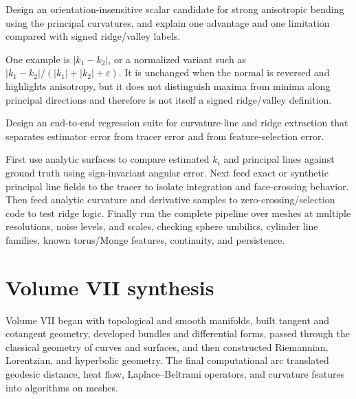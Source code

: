 \begin{problem}\label{prob:vii42-ch04}
Design an orientation-insensitive scalar candidate for strong anisotropic bending using the principal curvatures, and explain one advantage and one limitation compared with signed ridge/valley labels.
\end{problem}

\begin{solution}
One example is \(|k_1-k_2|\), or a normalized variant such as \(|k_1-k_2|/(|k_1|+|k_2|+\varepsilon)\).  It is unchanged when the normal is reversed and highlights anisotropy, but it does not distinguish maxima from minima along principal directions and therefore is not itself a signed ridge/valley definition.
\end{solution}

\begin{problem}\label{prob:vii42-ch05}
Design an end-to-end regression suite for curvature-line and ridge extraction that separates estimator error from tracer error and from feature-selection error.
\end{problem}

\begin{solution}
First use analytic surfaces to compare estimated \(k_i\) and principal lines against ground truth using sign-invariant angular error.  Next feed exact or synthetic principal line fields to the tracer to isolate integration and face-crossing behavior.  Then feed analytic curvature and derivative samples to zero-crossing/selection code to test ridge logic.  Finally run the complete pipeline over meshes at multiple resolutions, noise levels, and scales, checking sphere umbilics, cylinder line families, known torus/Monge features, continuity, and persistence.
\end{solution}


\section{Volume VII synthesis}

Volume VII began with topological and smooth manifolds, built tangent and
cotangent geometry, developed bundles and differential forms, passed through the
classical geometry of curves and surfaces, and then constructed Riemannian,
Lorentzian, and hyperbolic geometry.  The final computational arc translated
geodesic distance, heat flow, Laplace--Beltrami operators, and curvature features
into algorithms on meshes.

